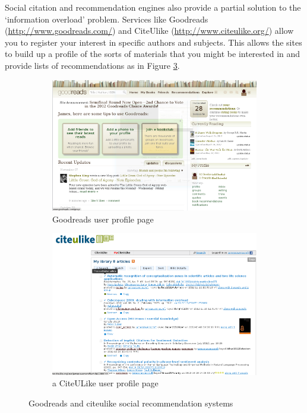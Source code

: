 Social citation and recommendation engines also provide a partial solution to
the `information overload' problem.  Services like Goodreads
(\url{http://www.goodreads.com/}) and CiteUlike
(\url{http://www.citeulike.org/}) allow you to register your interest in
specific authors and subjects. This allows the sites to build up a profile of
the sorts of materials that you might be interested in and provide lists of
recommendations as in Figure \ref{fig:social_indexes}.

\begin{figure}[!hbt]
        \centering
        \begin{subfigure}[b]{0.50\textwidth}
                \centering
                \includegraphics[width=\textwidth]{images/goodreads_index.png}
                \caption{Goodreads user profile page}
                \label{fig:goodreads_index}
        \end{subfigure}%
        \begin{subfigure}[b]{0.50\textwidth}
                \centering
                \includegraphics[width=\textwidth]{images/citeulike_index.png}
                \caption{a CiteULike user profile page}
                \label{fig:citeulike_index}
        \end{subfigure}

        \caption{Goodreads and citeulike social recommendation systems}
        \label{fig:social_indexes}
\end{figure}

